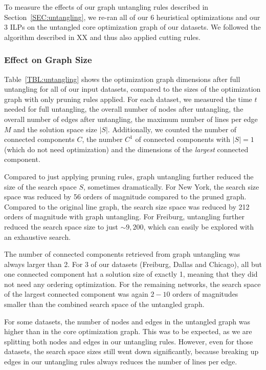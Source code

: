 \documentclass[format=acmsmall, review=false, screen=true]{acmart}
\begin{document}
To measure the effects of our graph untangling rules described in Section~\ref{SEC:untangling}, we re-ran all of our 6 heuristical optimizations and our 3 ILPs on the untangled core optimization graph of our datasets. We followed the algorithm described in XX and thus also applied cutting rules.

\subsubsection{Effect on Graph Size} 

Table~\ref{TBL:untangling} shows the optimization graph dimensions after full untangling for all of our input datasets, compared to the sizes of the optimization graph with only pruning rules applied.
For each dataset, we measured the time $t$ needed for full untangling, the overall number of nodes after untangling, the overall number of edges after untangling, the maximum number of lines per edge $M$ and the solution space size $|S|$. Additionally, we counted the number of connected components $C$, the number $C^1$ of connected components with $|S| = 1$ (which do not need optimization) and the dimensions of the \emph{largest} connected component.

Compared to just applying pruning rules, graph untangling further reduced the size of the search space $S$, sometimes dramatically.
For New York, the search size space was reduced by 56 orders of magnitude compared to the pruned graph.
Compared to the original line graph, the search size space was reduced by 212 orders of magnitude with graph untangling.
For Freiburg, untangling further reduced the search space size to just $\sim 9,200$, which can easily be explored with an exhaustive search.

The number of connected components retrieved from graph untangling was always larger than 2.
For 3 of our datasets (Freiburg, Dallas and Chicago), all but one connected component hat a solution size of exactly 1, meaning that they did not need any ordering optimization.
For the remaining networks, the search space of the largest connected component was again $2 - 10$ orders of magnitudes smaller than the combined search space of the untangled graph.

For some datasets, the number of nodes and edges in the untangled graph was higher than in the core optimization graph.
This was to be expected, as we are splitting both nodes and edges in our untangling rules.
However, even for those datasets, the search space sizes still went down significantly, because breaking up edges in our untangling rules always reduces the number of lines per edge.
\end{document}
